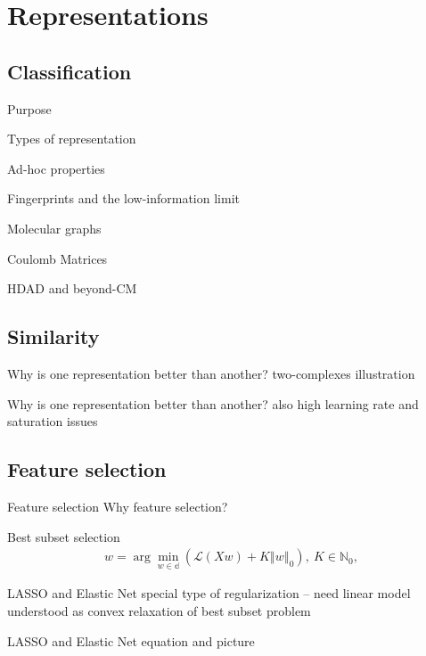 
\section{Representations}
\subsection{Classification}
\begin{frame}{Purpose}

\end{frame}
\begin{frame}{Types of representation}

\end{frame}
\begin{frame}{Ad-hoc properties}

\end{frame}
\begin{frame}{Fingerprints and the low-information limit}

\end{frame}
\begin{frame}{Molecular graphs}

\end{frame}
\begin{frame}{Coulomb Matrices}

\end{frame}
\begin{frame}{HDAD and beyond-CM}

\end{frame}
\subsection{Similarity}
\begin{frame}{Why is one representation better than another?}
two-complexes illustration 
\end{frame}
\begin{frame}{Why is one representation better than another?}
also high learning rate and saturation issues
\end{frame}

\subsection{Feature selection}
\begin{frame}{Feature selection}
Why feature selection?
\end{frame}
\begin{frame}{Best subset selection}
\begin{align*}
w=\arg\min_{w\in \mathbb{d}}\left(\mathcal{L}\left(Xw\right) + K\left\Vert w \right\Vert_0\right), \: K\in\mathbb{N}_{0},
\end{align*}
\end{frame}
\begin{frame}{LASSO and Elastic Net}
special type of regularization -- need linear model
understood as convex relaxation of best subset problem
\end{frame}
\begin{frame}{LASSO and Elastic Net}
equation and picture 
\end{frame}
